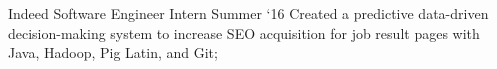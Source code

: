 \experience
    {Indeed}
    {Software Engineer Intern}
    {Summer `16}
    {
        Created a predictive data-driven decision-making system to increase SEO acquisition for job
        result pages with Java, Hadoop, Pig Latin, and Git;
    }
